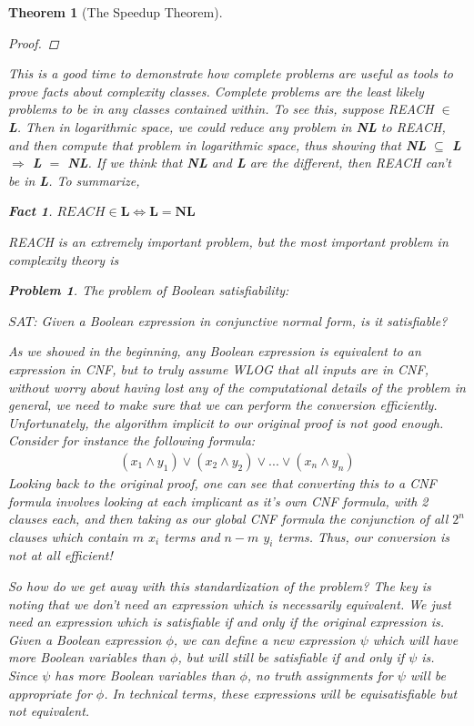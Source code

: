 \documentclass{article}
\theoremstyle{definition}
\newtheorem{problem}{Problem}
\theoremstyle{plain}
\theoremstyle{theorem}
\newtheorem{fact}{Fact}[section]
\newtheorem{theorem}{Theorem}[section]
\begin{document}
\begin{theorem}[The Speedup Theorem]
\begin{proof}
\end{proof}
This is a good time to demonstrate how complete problems are useful as tools to prove facts about complexity classes. \textit{Complete problems are the least likely problems to be in any classes contained within.} To see this, suppose REACH $\in$ \textbf{L}. Then in logarithmic space, we could reduce any problem in \textbf{NL} to REACH, and then compute that problem in logarithmic space, thus showing that \textbf{NL} $\subseteq$ \textbf{L} $\Rightarrow$ \textbf{L} $=$ \textbf{NL}. If we think that \textbf{NL} and \textbf{L} are the different, then REACH \textit{can't} be in \textbf{L}. To summarize,
\begin{fact}
    $REACH \in \textbf{L} \iff \textbf{L} = \textbf{NL}$
\end{fact}
REACH is an extremely important problem, but the most important problem in complexity theory is
\begin{problem} The problem of Boolean satisfiability:
\begin{center}
    $SAT$: Given a Boolean expression in conjunctive normal form, is it satisfiable?
\end{center}
\end{problem}
As we showed in the beginning, any Boolean expression is equivalent to an expression in CNF, but to truly assume WLOG that all inputs are in CNF, without worry about having lost any of the computational details of the problem in general, we need to make sure that we can perform the conversion \textit{efficiently}. Unfortunately, the algorithm implicit to our original proof is not good enough. Consider for instance the following formula:
\begin{align}
    (x_1\wedge y_1) \vee (x_2 \wedge y_2) \vee ... \vee (x_n \wedge y_n)
\end{align}
Looking back to the original proof, one can see that converting this to a CNF formula involves looking at each implicant as it's own CNF formula, with 2 clauses each, and then taking as our global CNF formula the conjunction of all $2^n$ clauses which contain $m$ $x_i$ terms and $n-m$ $y_i$ terms. Thus, our conversion is not at all efficient!
\par So how do we get away with this standardization of the problem? The key is noting that we don't need an expression which is necessarily \textit{equivalent}. We just need an expression which is satisfiable if and only if the original expression is. Given a Boolean expression $\phi$, we can define a new expression $\psi$ which will have more Boolean variables than $\phi$, but will still be satisfiable if and only if $\psi$ is. Since $\psi$ has more Boolean variables than $\phi$, no truth assignments for $\psi$ will be appropriate for $\phi$. In technical terms, these expressions will be \textit{equisatisfiable} but not \textit{equivalent}. 

\end{theorem}
\end{document}
